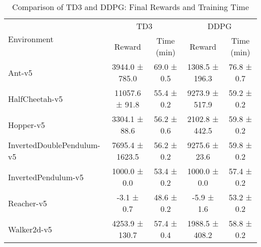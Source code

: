 \begin{table}[h]
\centering
\begin{tabular}{l c c c c}
\hline
\multirow{2}{*}{Environment} & \multicolumn{2}{c}{TD3} & \multicolumn{2}{c}{DDPG} \\
\cline{2-5}
& Reward & Time (min) & Reward & Time (min) \\
\hline
Ant-v5 & 3944.0 ± 785.0 & 69.0 ± 0.5 & 1308.5 ± 196.3 & 76.8 ± 0.7 \\
HalfCheetah-v5 & 11057.6 ± 91.8 & 55.4 ± 0.2 & 9273.9 ± 517.9 & 59.2 ± 0.2 \\
Hopper-v5 & 3304.1 ± 88.6 & 56.2 ± 0.6 & 2102.8 ± 442.5 & 59.8 ± 0.2 \\
InvertedDoublePendulum-v5 & 7695.4 ± 1623.5 & 56.2 ± 0.2 & 9275.6 ± 23.6 & 59.8 ± 0.2 \\
InvertedPendulum-v5 & 1000.0 ± 0.0 & 53.4 ± 0.2 & 1000.0 ± 0.0 & 57.4 ± 0.2 \\
Reacher-v5 & -3.1 ± 0.7 & 48.6 ± 0.2 & -5.9 ± 1.6 & 53.2 ± 0.2 \\
Walker2d-v5 & 4253.9 ± 130.7 & 57.4 ± 0.4 & 1988.5 ± 408.2 & 58.8 ± 0.2 \\
\hline
\end{tabular}
\caption{Comparison of TD3 and DDPG: Final Rewards and Training Time}
\end{table}
